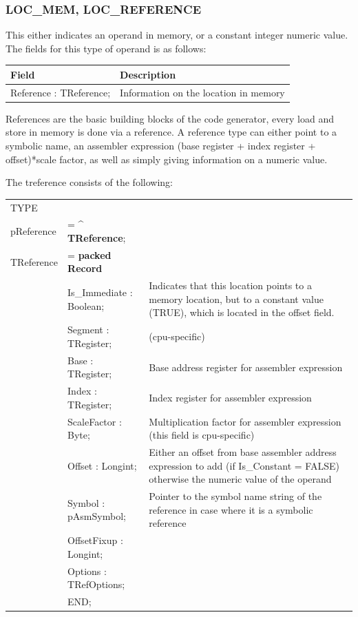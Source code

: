 \documentclass [a4paper,12pt]{article}
\begin{document}
\subsubsection{LOC{\_}MEM, LOC{\_}REFERENCE}
\label{subsubsec:mylabel21}

This either indicates an operand in memory, or a constant integer numeric
value. The fields for this type of operand is as follows:

\begin{longtable}{|l|p{10cm}|}
\hline
Field   & Description \\
\hline
\endhead
\hline
\endfoot
\textsf{Reference : TReference;}&
    Information on the location in memory
\end{longtable}

References are the basic building blocks of the code generator, every load
and store in memory is done via a reference. A reference type can either
point to a symbolic name, an assembler expression (base register + index
register + offset)*scale factor, as well as simply giving information on a
numeric value.

The treference consists of the following:

\begin{tabular*}{6.5in}{|l@{\extracolsep{\fill}}lp{}|}
\hline
\textsf{TYPE} & & \\
\xspace \textsf{pReference} &= \^{} \textbf{TReference};&  \\
\xspace \textsf{TReference} &= \textbf{packed Record} & \\
&\textsf{Is{\_}Immediate : Boolean;}&
    Indicates that this location points to a memory location, but to a
    constant value (TRUE), which is located in the offset field. \\
&\textsf{Segment : TRegister;}& (cpu-specific) \\
&\textsf{Base : TRegister;}&
    Base address register for assembler expression \\
&\textsf{Index : TRegister;}&
    Index register for assembler expression \\
&\textsf{ScaleFactor : Byte;}&
    Multiplication factor for assembler expression (this field is
    cpu-specific) \\
&\textsf{Offset : Longint;}&
    Either an offset from base assembler address expression to add (if
    Is{\_}Constant = FALSE) otherwise the numeric value of the operand \\
&\textsf{Symbol : pAsmSymbol;}&
    Pointer to the symbol name string of the reference in case where it is
    a symbolic reference \\
&\textsf{OffsetFixup : Longint;}&  \\
&\textsf{Options : TRefOptions;}&  \\
&\textsf{END;}&  \\
\hline
\end{tabular*}
\end{document}
